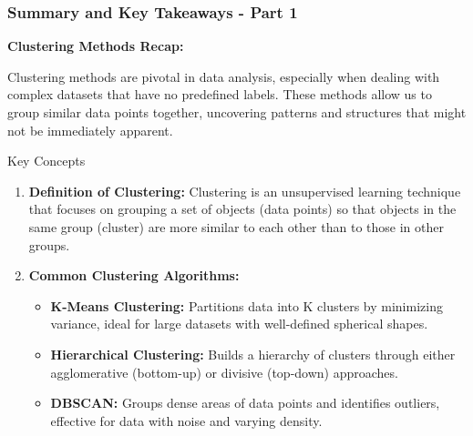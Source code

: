 \documentclass[aspectratio=169]{beamer}
\begin{document}
\begin{frame}[fragile]
  \frametitle{Summary and Key Takeaways - Part 1}

  \textbf{Clustering Methods Recap:}

  Clustering methods are pivotal in data analysis, especially when dealing with complex datasets that have no predefined labels. These methods allow us to group similar data points together, uncovering patterns and structures that might not be immediately apparent. 

  \begin{block}{Key Concepts}
      \begin{enumerate}
          \item \textbf{Definition of Clustering:}
          Clustering is an unsupervised learning technique that focuses on grouping a set of objects (data points) so that objects in the same group (cluster) are more similar to each other than to those in other groups.

          \item \textbf{Common Clustering Algorithms:}
          \begin{itemize}
              \item \textbf{K-Means Clustering:} Partitions data into K clusters by minimizing variance, ideal for large datasets with well-defined spherical shapes.
              \item \textbf{Hierarchical Clustering:} Builds a hierarchy of clusters through either agglomerative (bottom-up) or divisive (top-down) approaches.
              \item \textbf{DBSCAN:} Groups dense areas of data points and identifies outliers, effective for data with noise and varying density.
          \end{itemize}
      \end{enumerate}
  \end{block}
\end{frame}
\end{document}
